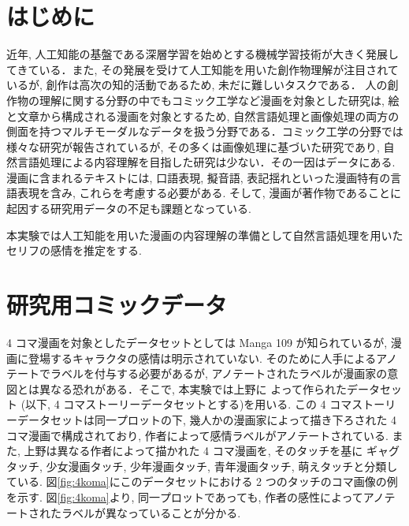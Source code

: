 \documentclass[twocolumn]{jarticle}     %
\begin{document}

\section{はじめに}
近年, 人工知能の基盤である深層学習を始めとする機械学習技術が大きく発展してきている．また, その発展を受けて人工知能を用いた創作物理解が注目されているが, 創作は高次の知的活動であるため, 未だに難しいタスクである．
人の創作物の理解に関する分野の中でもコミック工学など漫画を対象とした研究は, 絵と文章から構成される漫画を対象とするため, 自然言語処理と画像処理の両方の側面を持つマルチモーダルなデータを扱う分野である．コミック工学の分野では様々な研究が報告されているが, その多くは画像処理に基づいた研究であり, 自然言語処理による内容理解を目指した研究は少ない．その一因はデータにある. 漫画に含まれるテキストには, 口語表現, 擬音語, 表記揺れといった漫画特有の言語表現を含み, これらを考慮する必要がある. そして, 漫画が著作物であることに起因する研究用データの不足も課題となっている.

本実験では人工知能を用いた漫画の内容理解の準備として自然言語処理を用いたセリフの感情を推定をする.

\section{研究用コミックデータ}
4 コマ漫画を対象としたデータセットとしては Manga 109 が知られているが, 漫画に登場するキャラクタの感情は明示されていない. そのために人手によるアノテートでラベルを付与する必要があるが, アノテートされたラベルが漫画家の意図とは異なる恐れがある．そこで, 本実験では上野に
よって作られたデータセット\cite{ueno_miki2018} (以下, 4 コマストーリーデータセットとする)を用いる. この 4 コマストーリーデータセットは同一プロットの下, 幾人かの漫画家によって描き下ろされた 4 コマ漫画で構成されており, 作者によって感情ラベルがアノテートされている.
また, 上野は異なる作者によって描かれた 4 コマ漫画を, そのタッチを基に
ギャグタッチ, 少女漫画タッチ, 少年漫画タッチ, 青年漫画タッチ, 萌えタッチと分類している. 図\ref{fig:4koma}にこのデータセットにおける 2 つのタッチのコマ画像の例を示す. 図\ref{fig:4koma}より, 同一プロットであっても, 作者の感性によってアノテートされたラベルが異なっていることが分かる.
\end{document}
